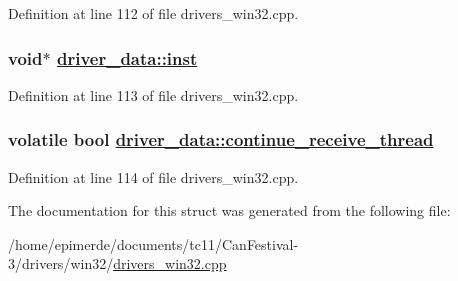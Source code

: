 Definition at line 112 of file drivers\_\-win32.cpp.\hypertarget{structdriver__data_7b72c29b808518f746698a7530e699db}{
\subsubsection[inst]{\setlength{\rightskip}{0pt plus 5cm}void$\ast$ \hyperlink{structdriver__data_7b72c29b808518f746698a7530e699db}{driver\_\-data::inst}}}
\label{structdriver__data_7b72c29b808518f746698a7530e699db}




Definition at line 113 of file drivers\_\-win32.cpp.\hypertarget{structdriver__data_58870858d50af0a8e0fc198a0fd54a42}{
\subsubsection[continue\_\-receive\_\-thread]{\setlength{\rightskip}{0pt plus 5cm}volatile bool \hyperlink{structdriver__data_58870858d50af0a8e0fc198a0fd54a42}{driver\_\-data::continue\_\-receive\_\-thread}}}
\label{structdriver__data_58870858d50af0a8e0fc198a0fd54a42}




Definition at line 114 of file drivers\_\-win32.cpp.

The documentation for this struct was generated from the following file:\begin{CompactItemize}
\item 
/home/epimerde/documents/tc11/Can\-Festival-3/drivers/win32/\hyperlink{drivers__win32_8cpp}{drivers\_\-win32.cpp}\end{CompactItemize}
